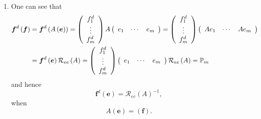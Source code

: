 \documentclass[aps,preprint]{revtex4}%
\begin{document}
\begin{enumerate}
\item One can see that
\begin{align}
\boldsymbol{f}^{d}\left(  \boldsymbol{f}\right)   &  =\boldsymbol{f}%
^{d}\left(  A\left(  \boldsymbol{e}\right)  \right)  =\left(
\begin{array}
[c]{c}%
f_{1}^{d}\\
\vdots\\
f_{m}^{d}%
\end{array}
\right)  A\left(
\begin{array}
[c]{ccc}%
e_{1} & \cdots & e_{m}%
\end{array}
\right)  =\left(
\begin{array}
[c]{c}%
f_{1}^{d}\\
\vdots\\
f_{m}^{d}%
\end{array}
\right)  \left(
\begin{array}
[c]{ccc}%
Ae_{1} & \cdots & Ae_{m}%
\end{array}
\right) \\
&  =\boldsymbol{f}^{d}\left(  \boldsymbol{e}\right)  \mathcal{R}_{ee}\left(
A\right)  =\left(
\begin{array}
[c]{c}%
f_{1}^{d}\\
\vdots\\
f_{m}^{d}%
\end{array}
\right)  \left(
\begin{array}
[c]{ccc}%
e_{1} & \cdots & e_{m}%
\end{array}
\right)  \mathcal{R}_{ee}\left(  A\right)  =\mathbb{P}_{m}%
\end{align}
and hence
\begin{equation}
\boldsymbol{f}^{d}\left(  \boldsymbol{e}\right)  =\mathcal{R}_{ee}\left(
A\right)  ^{-1},
\end{equation}
when
\begin{equation}
A\left(  \boldsymbol{e}\right)  =\left(  \boldsymbol{f}\right)  .
\end{equation}



\end{enumerate}
\end{document}
